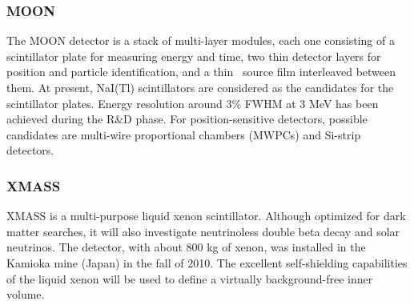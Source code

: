 \subsubsection*{MOON} The MOON detector \cite{Ejiri:2010zz} is a stack of multi-layer modules, each one consisting of a scintillator plate for measuring energy and time, two thin detector layers for position and particle identification, and a thin \bb\ source film interleaved between them. At present, NaI(Tl) scintillators are considered as the candidates for the scintillator plates. Energy resolution around 3\% FWHM at 3 MeV has been achieved during the R\&D phase. For position-sensitive detectors, possible candidates are multi-wire proportional chambers (MWPCs) and Si-strip detectors. 
%
\subsubsection*{XMASS} XMASS \cite{Sekiya:2010bf, Takeda:2011zza} is a multi-purpose liquid xenon scintillator. Although optimized for dark matter searches, it will also investigate neutrinoless double beta decay and solar neutrinos. The detector, with about 800 kg of xenon, was installed in the Kamioka mine (Japan) in the fall of 2010. The excellent self-shielding capabilities of the liquid xenon will be used to define a virtually background-free inner volume. 
